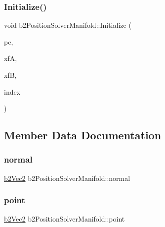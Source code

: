 \subsubsection{\texorpdfstring{Initialize()}{Initialize()}}
{\footnotesize\ttfamily void b2\+Position\+Solver\+Manifold\+::\+Initialize (\begin{DoxyParamCaption}\item[{\mbox{\hyperlink{structb2_contact_position_constraint}{b2\+Contact\+Position\+Constraint}} $\ast$}]{pc,  }\item[{const \mbox{\hyperlink{structb2_transform}{b2\+Transform}} \&}]{xfA,  }\item[{const \mbox{\hyperlink{structb2_transform}{b2\+Transform}} \&}]{xfB,  }\item[{\mbox{\hyperlink{b2_settings_8h_a43d43196463bde49cb067f5c20ab8481}{int32}}}]{index }\end{DoxyParamCaption})\hspace{0.3cm}{\ttfamily [inline]}}



\subsection{Member Data Documentation}
\mbox{\label{structb2_position_solver_manifold_a4a1073e69ab49f55b7013d4aef96fe1c}} 
\subsubsection{\texorpdfstring{normal}{normal}}
{\footnotesize\ttfamily \mbox{\hyperlink{structb2_vec2}{b2\+Vec2}} b2\+Position\+Solver\+Manifold\+::normal}

\mbox{\label{structb2_position_solver_manifold_a9b7a88173cc0295e2883e2ac8b7c46f2}} 
\subsubsection{\texorpdfstring{point}{point}}
{\footnotesize\ttfamily \mbox{\hyperlink{structb2_vec2}{b2\+Vec2}} b2\+Position\+Solver\+Manifold\+::point}

